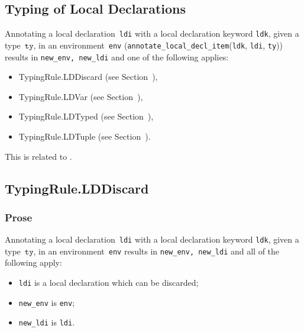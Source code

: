 \documentclass{book}
\newcommand\annotatelocaldeclitem[1]{\texttt{annotate\_local\_decl\_item}(#1)}
\newcommand\ldi[0]{\texttt{ldi}}
\newcommand\ldk[0]{\texttt{ldk}}
\newcommand\tty[0]{\texttt{ty}}
\begin{document}
\begin{itemize}

\chapter{Typing of Local Declarations}

Annotating a local declaration~\texttt{ldi} with a local declaration keyword \texttt{ldk}, given a type~$\tty$, in an
environment~\texttt{env} (\annotatelocaldeclitem{\ldk, \ldi, \tty}) results in \texttt{new\_env, new\_ldi} and one of the following applies:
\begin{itemize}
\item TypingRule.LDDiscard (see Section~),
\item TypingRule.LDVar (see Section~),
\item TypingRule.LDTyped (see Section~),
\item TypingRule.LDTuple (see Section~).
\end{itemize}

This is related to .

\section{TypingRule.LDDiscard \label{sec:TypingRule.LDDiscard}}

  \subsection{Prose}
    Annotating a local declaration~\texttt{ldi} with a local declaration keyword \texttt{ldk}, given a type~$\tty$, in
an environment~\texttt{env} results in \texttt{new\_env, new\_ldi} and all of
the following apply:
   \begin{itemize}
   \item \texttt{ldi} is a local declaration which can be discarded;
   \item \texttt{new\_env} is \texttt{env};
   \item \texttt{new\_ldi} is \texttt{ldi}.
   \end{itemize}


\end{itemize}
\end{document}
